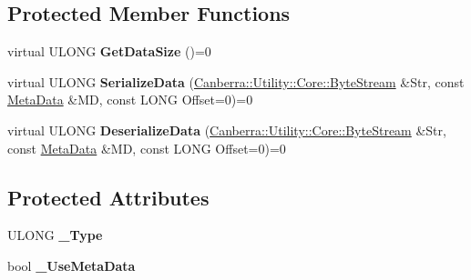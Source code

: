 \subsection*{Protected Member Functions}
\begin{DoxyCompactItemize}
\item 
\mbox{\label{class_canberra_1_1_serialization_1_1_serializable_object_aeea4076233d10b8d485e474e47455e36}} 
virtual U\+L\+O\+NG {\bfseries Get\+Data\+Size} ()=0
\item 
\mbox{\label{class_canberra_1_1_serialization_1_1_serializable_object_ad53b676c25c6fdf48aa861b36709eba4}} 
virtual U\+L\+O\+NG {\bfseries Serialize\+Data} (\hyperlink{class_canberra_1_1_utility_1_1_core_1_1_byte_stream}{Canberra\+::\+Utility\+::\+Core\+::\+Byte\+Stream} \&Str, const \hyperlink{class_canberra_1_1_serialization_1_1_meta_data}{Meta\+Data} \&MD, const L\+O\+NG Offset=0)=0
\item 
\mbox{\label{class_canberra_1_1_serialization_1_1_serializable_object_aea035ce63d01acfb02185016fb648ece}} 
virtual U\+L\+O\+NG {\bfseries Deserialize\+Data} (\hyperlink{class_canberra_1_1_utility_1_1_core_1_1_byte_stream}{Canberra\+::\+Utility\+::\+Core\+::\+Byte\+Stream} \&Str, const \hyperlink{class_canberra_1_1_serialization_1_1_meta_data}{Meta\+Data} \&MD, const L\+O\+NG Offset=0)=0
\end{DoxyCompactItemize}
\subsection*{Protected Attributes}
\begin{DoxyCompactItemize}
\item 
\mbox{\label{class_canberra_1_1_serialization_1_1_serializable_object_a62efa0d30e9df187718f2832622ac9fc}} 
U\+L\+O\+NG {\bfseries \+\_\+\+Type}
\item 
\mbox{\label{class_canberra_1_1_serialization_1_1_serializable_object_a4821112683d68c98c1522d75f186fb21}} 
bool {\bfseries \+\_\+\+Use\+Meta\+Data}
\end{DoxyCompactItemize}


